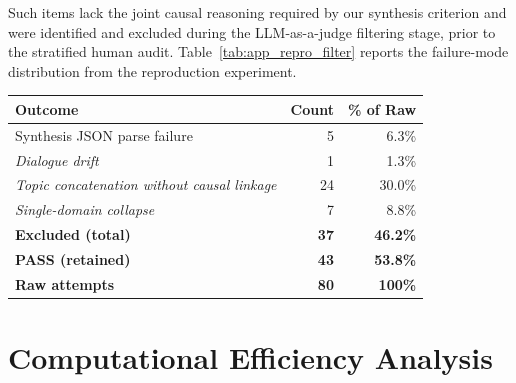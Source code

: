 \documentclass[a4paper,fleql,doubleblind]{cas-sc}
\begin{document}
Such items lack the joint causal reasoning required by our synthesis
criterion and were identified and excluded
during the LLM-as-a-judge filtering stage, prior to the stratified human
audit.
Table~\ref{tab:app_repro_filter} reports the failure-mode distribution
from the reproduction experiment.

\vspace{6pt plus 4pt minus 3pt}
\begin{center}
\begingroup
{}
\label{tab:app_repro_filter}
\renewcommand{\arraystretch}{1.3}
\begin{tabular}{lrr}
\toprule
\textbf{Outcome} & \textbf{Count} & \textbf{\% of Raw} \\
\midrule
Synthesis JSON parse failure        &  5 &  6.3\% \\
\textit{Dialogue drift}             &  1 &  1.3\% \\
\textit{Topic concatenation without causal linkage} & 24 & 30.0\% \\
\textit{Single-domain collapse}     &  7 &  8.8\% \\
\midrule
\textbf{Excluded (total)}           & \textbf{37} & \textbf{46.2\%} \\
\midrule
\textbf{PASS (retained)}            & \textbf{43} & \textbf{53.8\%} \\
\midrule
\textbf{Raw attempts}               & \textbf{80} & \textbf{100\%} \\
\bottomrule
\end{tabular}
\endgroup
\end{center}
\vspace{6pt plus 4pt minus 3pt}

\section{Computational Efficiency Analysis}
\label{supp:complexity}
\end{document}

